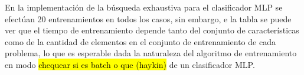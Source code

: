 En la implementación de la búsqueda exhaustiva para el clasificador
MLP se efectúan 20 entrenamientos en todos los casos, sin embargo,
e la tabla se puede ver que el tiempo de entrenamiento
depende tanto del conjunto de características como de la
cantidad de elementos en el conjunto de entrenamiento de cada
problema, lo que es esperable dada la naturaleza del algoritmo
de entrenamiento en modo  \hl{chequear si es batch o que (haykin)}
de un clasificador MLP.